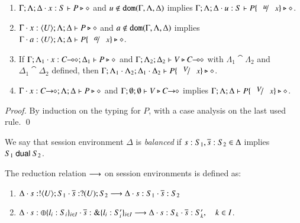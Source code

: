 \begin{lemma}\rm
	\label{lem:subst}
	\begin{enumerate}[1.]
		\item	$\Gamma; \Lambda; \Delta \cdot x:S  \vdash P \triangleright \diamond$ and
			$u \not\in \mathtt{dom}(\Gamma, \Lambda, \Delta)$
			implies
			$\Gamma; \Lambda; \Delta \cat u:S  \proves P\subst{u}{x} \hastype \Proc$.

		\item	$\Gamma \cdot x:\langle U \rangle; \Lambda; \Delta \vdash P \triangleright \diamond$ and
			$a \notin \mathtt{dom}(\Gamma, \Lambda, \Delta)$
			implies
			$\Gamma \cat a:\chtype{U}; \Lambda; \Delta \proves P\subst{a}{x} \hastype \Proc$.

		\item	If $\Gamma; \Lambda_1 \cdot x:C\!\! \multimap\!\! \diamond; \Delta_1  \vdash P \triangleright \diamond$ 
			and $\Gamma; \Lambda_2; \Delta_2  \vdash V \triangleright C\!\! \multimap\!\! \diamond$ with 
			$\Lambda_1 \cat \Lambda_2$ and $\Delta_1 \cat \Delta_2$ defined,
			then $\Gamma; \Lambda_1 \cat \Lambda_2; \Delta_1 \cat \Delta_2  \proves P\subst{V}{x} \hastype \Proc$.

		\item	$\Gamma \cdot x:C\!\! \rightarrow\!\! \diamond; \Lambda; \Delta  \vdash P \triangleright \diamond$ and
			$\Gamma; \emptyset ; \emptyset \vdash V \triangleright C\!\! \rightarrow\!\! \diamond$
			implies
			$\Gamma; \Lambda; \Delta \proves P\subst{V}{x} \hastype \Proc$.
		\end{enumerate}
\end{lemma}

\begin{proof}
	By induction on the typing for $P$, with a case analysis on the last used rule. 
	\qed
\end{proof}

\begin{definition}\label{d:wtenv}\rm
	We say that session environment $\Delta$ is {\em balanced} if
	$s: S_1, \overline{s}: S_2 \in \Delta$ implies $S_1 \ \mathsf{dual}\  S_2$.
\end{definition}

\begin{definition}\rm
\label{def:ses_red}
	The reduction relation $\longrightarrow$ on session environments is defined as:
%
	\begin{enumerate}[$-$]
		\item	$\Delta \cdot s: ! \langle U \rangle ; S_1 \cdot \overline{s}: ? (U) ; S_2 \longrightarrow \Delta \cdot s: S_1 \cdot \overline{s}: S_2$
		\item	$\Delta \cdot s: \oplus \{l_i: S_i\}_{i \in I} \cdot \overline{s}: \& \{l_i: S_i'\}_{i \in I} \longrightarrow \Delta \cdot s: S_k \cdot \overline{s}: S_k', \quad k \in I$.
	\end{enumerate}
\end{definition}

